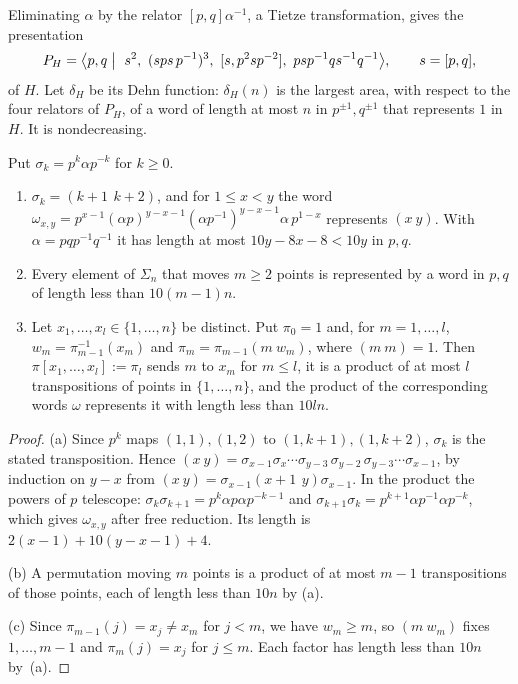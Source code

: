 Eliminating $\alpha$ by the relator $[p,q]\alpha^{-1}$, a Tietze transformation, gives the presentation
\begin{equation}\label{eq:PH}
P_H=\bigl\langle p,q\bigm|\ s^2,\ (sps\,p^{-1})^3,\ [s,p^2sp^{-2}],\ psp^{-1}qs^{-1}q^{-1}\bigr\rangle,\qquad s=[p,q],
\end{equation}
of $H$. Let $\delta_H$ be its Dehn function: $\delta_H(n)$ is the largest area, with respect to the four relators of $P_H$, of a word of length at most
$n$ in $p^{\pm1},q^{\pm1}$ that represents $1$ in $H$. It is nondecreasing.

\begin{lemma}\label{lem:transpositions}
Put $\sigma_k=p^k\alpha p^{-k}$ for $k\ge0$.
\begin{enumerate}[label=(\alph*),itemsep=1pt]
\item $\sigma_k=(k+1\ \,k+2)$, and for $1\le x<y$ the word
$\omega_{x,y}=p^{x-1}(\alpha p)^{y-x-1}(\alpha p^{-1})^{y-x-1}\alpha\,p^{1-x}$ represents $(x\ y)$. With $\alpha=pqp^{-1}q^{-1}$ it has length at most
$10y-8x-8<10y$ in $p,q$.
\item Every element of $\Sigma_n$ that moves $m\ge2$ points is represented by a word in $p,q$ of length less than $10(m-1)n$.
\item Let $x_1,\dots,x_l\in\{1,\dots,n\}$ be distinct. Put $\pi_0=1$ and, for $m=1,\dots,l$, $w_m=\pi_{m-1}^{-1}(x_m)$ and
$\pi_m=\pi_{m-1}(m\ w_m)$, where $(m\ m)=1$. Then $\pi[x_1,\dots,x_l]:=\pi_l$ sends $m$ to $x_m$ for $m\le l$, it is a product of at most $l$
transpositions of points in $\{1,\dots,n\}$, and the product of the corresponding words $\omega$ represents it with length less than $10ln$.
\end{enumerate}
\end{lemma}

\begin{proof}
(a) Since $p^k$ maps $(1,1),(1,2)$ to $(1,k+1),(1,k+2)$, $\sigma_k$ is the stated transposition. Hence
$(x\ y)=\sigma_{x-1}\sigma_x\cdots\sigma_{y-3}\,\sigma_{y-2}\,\sigma_{y-3}\cdots\sigma_{x-1}$, by induction on $y-x$ from
$(x\ y)=\sigma_{x-1}(x{+}1\ \,y)\sigma_{x-1}$. In the product the powers of $p$ telescope: $\sigma_k\sigma_{k+1}=p^k\alpha p\alpha p^{-k-1}$ and
$\sigma_{k+1}\sigma_k=p^{k+1}\alpha p^{-1}\alpha p^{-k}$, which gives $\omega_{x,y}$ after free reduction. Its length is
$2(x-1)+10(y-x-1)+4$.

(b) A permutation moving $m$ points is a product of at most $m-1$ transpositions of those points, each of length less than $10n$ by (a).

(c) Since $\pi_{m-1}(j)=x_j\ne x_m$ for $j<m$, we have $w_m\ge m$, so $(m\ w_m)$ fixes $1,\dots,m-1$ and $\pi_m(j)=x_j$ for $j\le m$. Each factor
has length less than $10n$ by~(a).
\end{proof}

